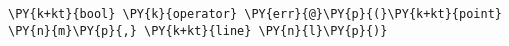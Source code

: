 \begin{Verbatim}[commandchars=\\\{\}]
    \PY{k+kt}{bool} \PY{k}{operator} \PY{err}{@}\PY{p}{(}\PY{k+kt}{point} \PY{n}{m}\PY{p}{,} \PY{k+kt}{line} \PY{n}{l}\PY{p}{)}
\end{Verbatim}
